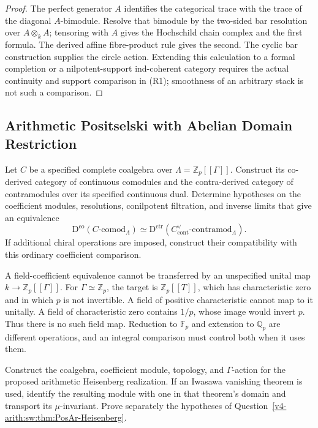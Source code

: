 \begin{proof}
The perfect generator \(A\) identifies the categorical trace with
the trace of the diagonal \(A\)-bimodule. Resolve that bimodule by
the two-sided bar resolution over \(A\otimes_k A\); tensoring
with \(A\) gives the Hochschild chain complex and the first
formula. The derived affine fibre-product rule gives the second.
The cyclic bar construction supplies the circle action. Extending
this calculation to a formal completion or a nilpotent-support
ind-coherent category requires the actual continuity and support
comparison in (R1); smoothness of an arbitrary stack is not such
a comparison.
\end{proof}

\subsection{Arithmetic Positselski with Abelian Domain Restriction}

\begin{question}
\label{v4-arith:sw:thm:PosAr-Heisenberg}
Let \(C\) be a specified complete coalgebra over
\(\Lambda=\mathbb Z_p[[\Gamma]]\).
Construct its co-derived category of continuous comodules and the
contra-derived category of contramodules over its specified continuous dual.
Determine hypotheses on the coefficient modules, resolutions,
conilpotent filtration, and inverse limits that give an equivalence
\[
 \mathrm D^{\mathrm{co}}(C\text{-comod}_{\Lambda})
 \simeq
 \mathrm D^{\mathrm{ctr}}(C^\vee_{\mathrm{cont}}
                         \text{-contramod}_{\Lambda}).
\]
If additional chiral operations are imposed, construct their
compatibility with this ordinary coefficient comparison.
\end{question}

A field-coefficient equivalence cannot be transferred by an
unspecified unital map \(k\to\mathbb Z_p[[\Gamma]]\).
For \(\Gamma\simeq\mathbb Z_p\), the target is
\(\mathbb Z_p[[T]]\), which has characteristic zero and in which
\(p\) is not invertible. A field of positive characteristic cannot
map to it unitally. A field of characteristic zero contains \(1/p\),
whose image would invert \(p\). Thus there is no such field map.
Reduction to \(\mathbb F_p\) and extension to \(\mathbb Q_p\)
are different operations, and an integral comparison must control
both when it uses them.

\begin{question}
\label{v4-arith:sw:cor:PosAr-Heis-applies}
Construct the coalgebra, coefficient module, topology, and
\(\Gamma\)-action for the proposed arithmetic Heisenberg realization.
If an Iwasawa vanishing theorem is used, identify the resulting
module with one in that theorem's domain and transport its
\(\mu\)-invariant. Prove separately the hypotheses of
Question~\ref{v4-arith:sw:thm:PosAr-Heisenberg}.
\end{question}

